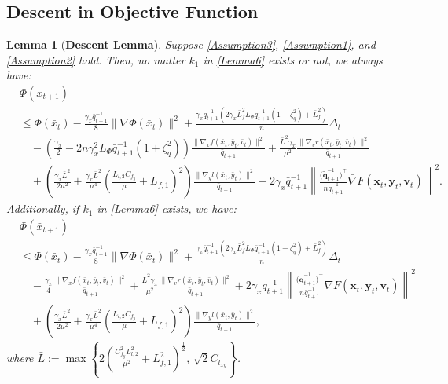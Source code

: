 \documentclass{article}
\theoremstyle{plain}
\newtheorem{lemma}[lemma]{Lemma}
\theoremstyle{definition}
\theoremstyle{remark}
\begin{document}
\subsection{Descent in Objective Function}\label{secc2}
\begin{lemma}[\textbf{Descent Lemma}]\label{Lemma4} Suppose \cref{Assumption3}, \cref{Assumption1}, and \cref{Assumption2} hold. Then, no matter $k_1$ in \cref{Lemma6} exists or not, we always have:
\begin{align}
&\Phi(\bar{x}_{t+1})\nonumber\\
&\leq\Phi(\bar{x}_t)-\frac{\gamma_x \bar{q}_{t+1}^{-1}}{8}\|\nabla \Phi(\bar{x}_t)\|^2+\frac{\gamma_x\bar{q}_{t+1}^{-1}(2\gamma_x \bar{L}_{f}^2L_\Phi \bar{q}_{t+1}^{-1} \left(1 +\zeta_q^2\right)+\bar{L}_{f}^2)}{n} \Delta_t\nonumber\\
&\quad -\left(\frac{\gamma_x}{2}-{2n\gamma_x^2 L_\Phi \bar{q}_{t+1}^{-1} \left(1 +\zeta_q^2\right)}\right)\frac{\|\nabla_x f(\bar{x}_t, \bar{y}_t, \bar{v}_t)\|^2}{\bar{q}_{t+1}}
+ \frac{\bar{L}^2\gamma_x }{\mu^2} \frac{\|\nabla_v r(\bar{x}_t, \bar{y}_t, \bar{v}_t)\|^2}{\bar{q}_{t+1}} \nonumber \\
&\quad +\left( \frac{\gamma_x\bar{L}^2}{2\mu^2} \!\!+\!\! \frac{\gamma_x\bar{L}^2}{\mu^4} \left( \frac{L_{l,2} C_{f_y}}{\mu} \!\!+ \!\!L_{f,1} \right)^2 \right) \frac{\|\nabla_y l(\bar{x}_t, \bar{y}_t)\|^2}{\bar{q}_{t+1}}\!+\! 2\gamma_x \bar{q}_{t+1}^{-1}  \left\| \frac{\big(\tilde{\mathbf{q}}_{t+1}^{-1}\big)^\top}{n\bar{q}_{t+1}^{-1}} \bar{\nabla} F(\mathbf{x}_t, \mathbf{y}_t, \mathbf{v}_t) \right\|^2\!.\label{eqnew1}
\end{align}
Additionally, if $k_1$ in \cref{Lemma6} exists, we have:
\begin{align}
&\Phi(\bar{x}_{t+1})\nonumber\\
&\leq\Phi(\bar{x}_t)-\frac{\gamma_x \bar{q}_{t+1}^{-1}}{8}\|\nabla \Phi(\bar{x}_t)\|^2+\frac{\gamma_x\bar{q}_{t+1}^{-1}(2\gamma_x \bar{L}_{f}^2L_\Phi \bar{q}_{t+1}^{-1} \left(1 +\zeta_q^2\right)+\bar{L}_{f}^2)}{n} \Delta_t\nonumber\\
&\quad -\frac{\gamma_x }{4}\frac{\|\nabla_x f(\bar{x}_t, \bar{y}_t, \bar{v}_t)\|^2}{\bar{q}_{t+1}}
+ \frac{\bar{L}^2\gamma_x }{\mu^2} \frac{\|\nabla_v r(\bar{x}_t, \bar{y}_t, \bar{v}_t)\|^2}{\bar{q}_{t+1}}+ 2\gamma_x \bar{q}_{t+1}^{-1}  \left\| \frac{\big(\tilde{\mathbf{q}}_{t+1}^{-1}\big)^\top}{n\bar{q}_{t+1}^{-1}} \bar{\nabla} F(\mathbf{x}_t, \mathbf{y}_t, \mathbf{v}_t) \right\|^2\nonumber\\
&\quad+\left(\! \frac{\gamma_x\bar{L}^2}{2\mu^2} + \frac{\gamma_x\bar{L}^2}{\mu^4} \!\!\left(\! \frac{L_{l,2} C_{f_y}}{\mu} + L_{f,1} \!\right)^2 \right)\!\! \frac{\|\nabla_y l(\bar{x}_t, \bar{y}_t)\|^2}{\bar{q}_{t+1}},\label{eqnew2}
\end{align}
where $\bar{L} := \max \left\{ 2 \left( \frac{C_{f_y}^2 L_{l,2}^2}{\mu^2} + L_{f,1}^2 \right)^{\frac{1}{2}}, \, \sqrt{2} C_{l_{xy}} \right\}$.
\end{lemma}
\end{document}
